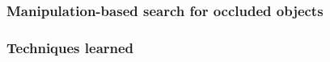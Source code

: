 \begin{frame}
\frametitle{Manipulation-based search for occluded objects}
\end{frame}

\begin{frame}
  \frametitle{Techniques learned}
\end{frame}

